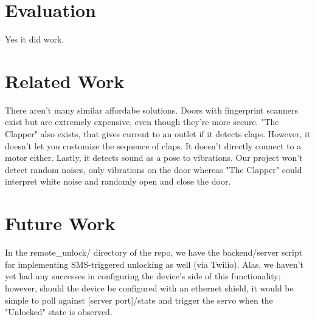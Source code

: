\documentclass[11pt]{article}			%
\begin{document}
\section{Evaluation}
Yes it did work. 

\section{Related Work}
There aren't many similar affordabe solutions. Doors with fingerprint scanners exist but are extremely expensive, even though they're more secure. "The Clapper" also exists, that gives current to an outlet if it detects claps. However, it doesn't let you customize the sequence of claps. It doesn't directly connect to a motor either. Lastly, it detects sound as a pose to vibrations. Our project won't detect random noises, only vibrations on the door whereas "The Clapper" could interpret white noise and randomly open and close the door.

\section{Future Work}

In the remote\_unlock/ directory of the repo, we have the backend/server script for implementing SMS-triggered unlocking as well (via Twilio). Alas, we haven't yet had any successes in configuring the device's side of this functionality; however, should the device be configured with an ethernet shield, it would be simple to poll against [server port]/state and trigger the servo when the "Unlocked" state is observed.
\end{document}
